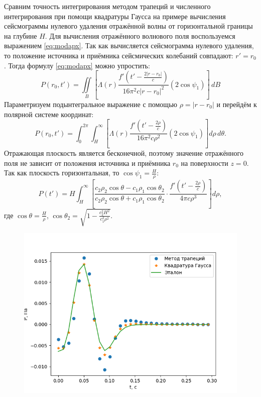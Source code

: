 Сравним точность интегрирования методом трапеций и численного интегрирования при помощи квадратуры Гаусса на примере вычисления сейсмограммы нулевого удаления отражённой волны от горизонтальной границы на глубине $H$.
Для вычисления отражённого волнового поля воспользуемся выражением \eqref{eq:modapx}. Так как вычисляется сейсмограмма нулевого удаления, то положение источника и приёмника сейсмических колебаний совпадают: $r' = r_0$. Тогда формулу  \eqref{eq:modapx} можно упростить:
\begin{equation}
			P(r_0,t') = \iint\limits_{B} \left[\Lambda(r) \frac{f'\left(t'-\frac{2|r-r_0|}{c}\right) }{16\pi^2c|r-r_0|^2} (2\cos \psi_1 ) \right] \,dB
\end{equation}
Параметризуем подынтегральное выражение с помощью $\rho = |r-r_0|$ и перейдём к полярной системе координат:
\begin{equation}
	P(r_0,t') = \int_0^{2\pi}  \int_H^{\infty} \left[\Lambda(r) \frac{f'\left(t'-\frac{2\rho}{c}\right) }{16\pi^2c\rho^2} (2\cos \psi_1 ) \right] d\rho\,d\theta.
\end{equation}
Отражающая плоскость является бесконечной, поэтому значение отражённого поля не зависит от положения источника и приёмника $r_0$ на поверхности $z=0$.
Так как плоскость горизонтальная, то $\cos \psi_1 = \frac{H}{\rho}$:
\begin{equation}
	P(t') = H \int_H^{\infty} \left[ \frac{c_2 \rho_2 \cos \theta - c_1 \rho_1 \cos \theta_2}{c_2 \rho_2 \cos \theta + c_1 \rho_1 \cos \theta_2}  \cdot \frac{f'\left(t'-\frac{2\rho}{c}\right) }{4\pi c\rho^3}  \right] d\rho,
\end{equation}
где $\cos \theta = \frac{H}{\rho}$,  $\cos \theta_2 = \sqrt{1-\frac{c_2^2 H^2}{c_1^2\rho^2}}$.

\begin{figure}[H]
	\centering
	\includegraphics[width=.8\textwidth]{trapgauss.png}
	\caption{}
	\label{fig:trapgauss}
\end{figure}

